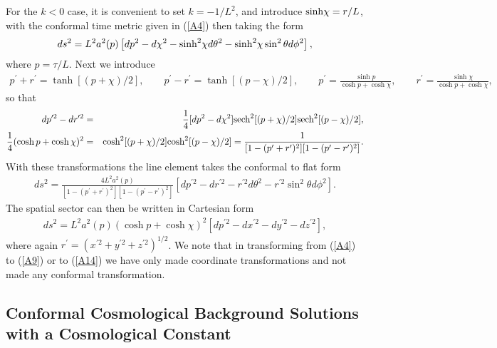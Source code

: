 \documentclass[aps]{revtex4}
\begin{document}
For the $k<0$ case, it is convenient to set $k=-1/L^2$, and introduce ${\rm sinh} \chi=r/L$, with the conformal time metric given in (\ref{A4}) then taking the form
%
\begin{eqnarray}
ds^2=L^2a^2(p)\left[dp^2-d\chi^2 -{\rm sinh}^2\chi d\theta^2-{\rm sinh}^2\chi \sin^2\theta d\phi^2\right],
\label{A10}
\end{eqnarray}
%
where $p=\tau/L$. Next we introduce
%
\begin{eqnarray}
p^{\prime}+r^{\prime}=\tanh[(p+\chi)/2],\qquad p^{\prime}-r^{\prime}=\tanh[(p-\chi)/2],\qquad p^{\prime}=\frac{\sinh p}{\cosh p+\cosh \chi},\qquad r^{\prime}=\frac{\sinh \chi}{\cosh p+\cosh \chi},
\label{A11}
\end{eqnarray}
%
so that
%
\begin{eqnarray}
dp^{\prime 2}-dr^{\prime 2}&=&\frac{1}{4}[dp^2-d\chi^2]{\rm sech}^2[(p+\chi)/2]{\rm sech}^2[(p-\chi)/2],
\nonumber\\
\frac{1}{4}(\cosh p+\cosh \chi)^2&=&{\rm \cosh}^2[(p+\chi)/2]{\rm \cosh}^2[(p-\chi)/2]=\frac{1}{[1-(p^{\prime}+r^{\prime})^2][1-(p^{\prime}-r^{\prime})^2]}.
\label{A12}
\end{eqnarray}
%
With these transformations the line element takes the conformal to flat form
%
\begin{eqnarray}
ds^2=\frac{4L^2a^2(p)}{[1-(p^{\prime}+r^{\prime})^2][1-(p^{\prime}-r^{\prime})^2]}\left[dp^{\prime 2}-dr^{\prime 2} -r^{\prime 2}d\theta^2-r^{\prime 2} \sin^2\theta d\phi^2\right].
\label{A13}
\end{eqnarray}
%
The spatial sector can then be written in Cartesian form
%
\begin{eqnarray}
ds^2=L^2a^2(p)(\cosh p+\cosh \chi)^2\left[dp^{\prime 2}-dx^{\prime 2} -dy^{\prime 2} -dz^{\prime 2}\right],
\label{A14}
\end{eqnarray}
%
where again $r^{\prime}=(x^{\prime 2}+ y^{\prime 2}+z^{\prime 2})^{1/2}$.  We note that in transforming from (\ref{A4}) to (\ref{A9}) or to (\ref{A14}) we have only made coordinate transformations and not made any conformal transformation. 

\subsection{Conformal Cosmological Background Solutions with a Cosmological Constant}
\end{document}
